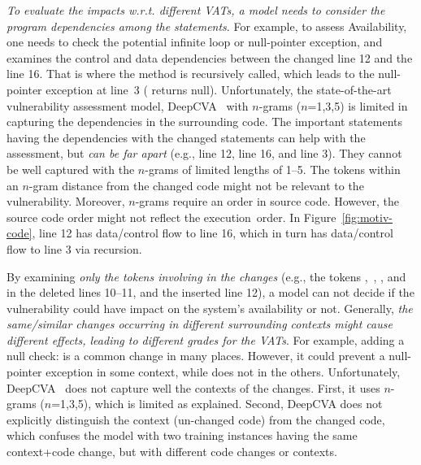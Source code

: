 \vspace{2pt}
  {\em To
  evaluate the impacts w.r.t. different VATs, a model needs to
  consider the program dependencies among the statements}. For
example, to assess Availability, one needs to check the potential
infinite loop or null-pointer exception, and examines the control and
data dependencies between the changed line 12 and the line 16. That is
where the method  is recursively called, which leads to
the null-pointer exception at line~3 (
returns null). Unfortunately, the state-of-the-art vulnerability
assessment model, DeepCVA~\cite{deepCVA-ase21} with $n$-grams
($n$=1,3,5)
is limited in capturing the dependencies in the surrounding code. The
important statements having the dependencies with the changed
statements can help with the assessment, but {\em can be far apart}
(e.g., line 12, line 16, and line 3). They cannot be well captured
with the $n$-grams of limited lengths of 1--5. The tokens within an
$n$-gram distance from the changed code might not be relevant to the
vulnerability. Moreover, $n$-grams require an order in source
code. However, the source code order might not reflect the execution~order. In Figure~\ref{fig:motiv-code}, line 12 has data/control flow to
line 16, which in turn has data/control flow to line 3 via recursion.


\vspace{1pt}
 By examining {\em only the tokens
involving in the changes} (e.g., the tokens
,~, , and 
in the deleted lines 10--11, and the inserted line 12), a model can
not decide if the vulnerability could have impact on the system's
availability or not.
Generally, {\em the same/similar changes occurring in different
  surrounding contexts might cause different effects, leading to
  different grades for the VATs}. For example, adding a null check:
 is a common change in many places. However, it
could prevent a null-pointer exception in some context, while does not
in the others.
Unfortunately, DeepCVA~\cite{deepCVA-ase21} does not capture well the
contexts of the changes. First, it uses $n$-grams ($n$=1,3,5), which
is limited as explained. Second, DeepCVA does not explicitly
distinguish the context (un-changed code) from the changed code, which
confuses the model with two training instances having the same
context+code change, but with different code
changes or contexts. 



